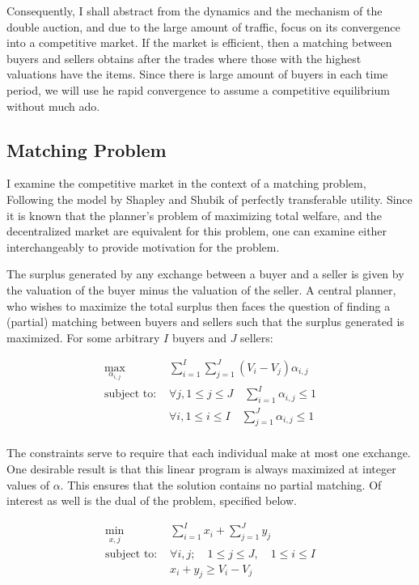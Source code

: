 \documentclass[12pt, letterpaper]{paper}
\begin{document}
Consequently, I shall abstract from the dynamics and the
mechanism of the double auction, and due to the large amount of
traffic, focus on its convergence into a competitive market. If the
market is efficient, then a matching between buyers and
sellers obtains after the trades where those with the highest
valuations have the items. Since there is large amount of buyers in
each time period, we will use he rapid convergence to assume a
competitive equilibrium without much ado.

\subsection{Matching Problem}
\label{sec-2-1}
I examine the competitive market in the context of a matching
problem, Following the model by Shapley and Shubik of perfectly transferable
utility. \citet*{LitReview}  Since it is known that the planner's problem of maximizing total
welfare, and the decentralized market are equivalent for this problem,
one can examine either interchangeably to provide motivation for the
problem. 

The surplus generated by any exchange between a buyer and a seller is
given by the valuation of the buyer minus the valuation of the
seller. A central planner, who wishes to maximize the total surplus
then faces the question of finding a (partial) matching between buyers
and sellers such that the surplus generated is maximized. For some
arbitrary $I$ buyers and $J$ sellers:

\begin{align*}
\max_{\alpha_{i,j}} & \sum_{i=1}^I \sum_{j=1}^J \left ( V_i - V_j \right ) \alpha_{i,j }\\
\text{subject to: } & \forall j, 1 \leq j \le J \quad \sum_{i=1}^I \alpha_{i,j} \leq 1 \\
& \forall i, 1 \leq i \leq I \quad \sum_{j=1}^J \alpha_{i,j} \le 1 \\
\end{align*}

The constraints serve to require that each individual make at most one
exchange. One desirable result is that this linear program is always
maximized at integer values of $\alpha$. This ensures that the solution
contains no partial matching.  Of interest as well is the dual of
the problem, specified below.

\begin{align*}
\min_{x,j} & \sum_{i=1}^I x_i + \sum_{j=1}^J y_j \\
\text{subject to: } & \forall i,j; \quad 1 \leq j \leq J, \quad 1 \le i \leq I\\
& x_i + y_j \geq V_i - V_j 
\end{align*}
\end{document}
